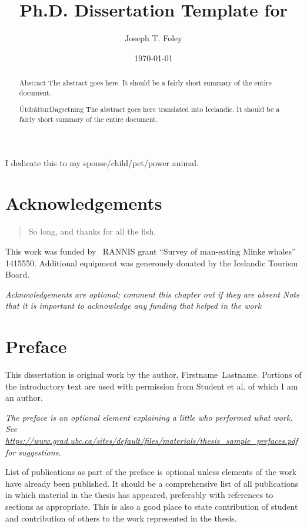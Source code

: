 \documentclass[12pt,a4paper,titlepage]{memoir}
\title{Ph.D. Dissertation Template for \theInstitution{}}
\author{Joseph T. Foley}%
\date{\today}%
\begin{document}
\maketitle
\copyrightpage{}
\signaturepage{}

\begin{abstract}{Abstract}{\thetitle}{\thedate}
  The abstract goes here.
  It should be a fairly short summary of the entire document.
\end{abstract}

\begin{abstract}{Útdráttur}{\thetitleIS}{Dagsetning}
  The abstract goes here translated into Icelandic.
  It should be a fairly short summary of the entire document.
\end{abstract}

\begin{dedications}
  I dedicate this to my spouse/child/pet/power animal.
\end{dedications}

\enableindents{}%

\chapter*{Acknowledgements} 
\begin{quotation}
So long, and thanks for all the fish.
\end{quotation}
\vspace{\baselineskip}

This work was funded by \the\year~RANNIS grant ``Survey of man-eating Minke whales'' 1415550.
Additional equipment was generously donated by the Icelandic Tourism Board.

{\em Acknowledgements are optional; comment this chapter out if they are absent
  Note that it is important to acknowledge any funding that helped in the work}



\chapter*{Preface}
This dissertation is original work by the author, Firstname~Lastname.
Portions of the introductory text are used with permission from
Student et al.\cite{student2015awesome} of which I am an author.

  
{\em The preface is an optional element
  explaining a little who performed what work.  See
  \url{https://www.grad.ubc.ca/sites/default/files/materials/thesis_sample_prefaces.pdf}
  for suggestions.
  
  List of publications as part of the preface is
  optional unless elements of the work have already been published.
  It should be a comprehensive list of all publications in which
  material in the thesis has appeared, preferably with references to
  sections as appropriate.  This is also a good place to state
  contribution of student and contribution of others to the work
  represented in the thesis.
}
\end{document}
